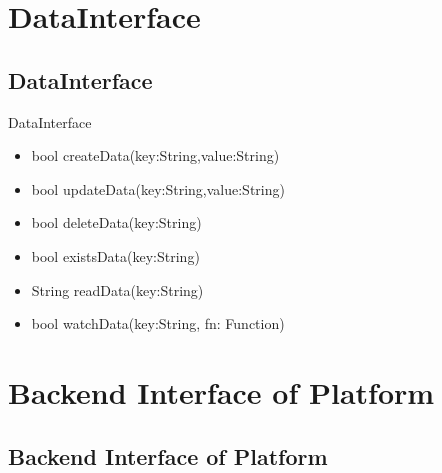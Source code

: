 \documentclass{beamer}
\newcommand{\drawLinkArrowVertical}[4]{
	\draw[->] let
		\p1 = (#1), \p2 = (#2),
		\p3 = (#3), \p4 = (#4)
		in
		({(\x1 + \x2)*1/2} ,\y1) -- ({(\x3 + \x4)*1/2} ,\y4);
}
\newcommand{\drawBox}[5]{{0}
		\shade[top color=#4,bottom color=#4,xslant=#5] (#1) rectangle (#2) node[midway,below] {#3};
}
\begin{document}
\section {DataInterface}
\subsection {DataInterface}
\begin{frame}
\begin{block}{DataInterface}
		\begin{itemize}
			\item bool \alert{createData}(key:String,value:String)
			\item bool \alert{updateData}(key:String,value:String)
			\item bool \alert{deleteData}(key:String)
			\item bool \alert{existsData}(key:String)
			\item String \alert{readData}(key:String)
			\item bool \alert{watchData}(key:String, fn: Function)
		\end{itemize}
	\end{block}

\end{frame}


\section {Backend Interface of Platform}
\subsection {Backend Interface of Platform}
\begin{frame}
\end{frame}
\end{document}
